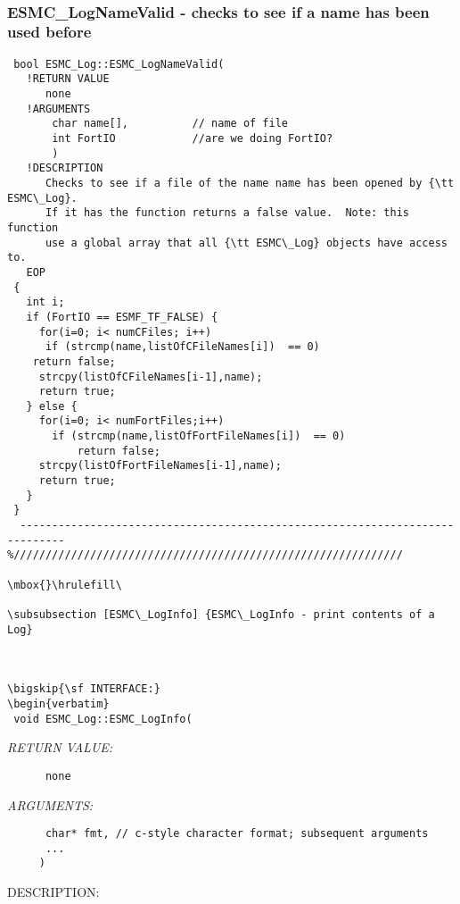  
\mbox{}\hrulefill\ 
 
\subsubsection [ESMC\_LogNameValid] {ESMC\_LogNameValid - checks to see if a name has been used before}


  
\begin{verbatim} bool ESMC_Log::ESMC_LogNameValid(
   !RETURN VALUE
      none
   !ARGUMENTS
       char name[],          // name of file
       int FortIO            //are we doing FortIO?
       )
   !DESCRIPTION
      Checks to see if a file of the name name has been opened by {\tt ESMC\_Log}.
      If it has the function returns a false value.  Note: this function
      use a global array that all {\tt ESMC\_Log} objects have access to.
   EOP
 {
   int i;
   if (FortIO == ESMF_TF_FALSE) {
     for(i=0; i< numCFiles; i++)
      if (strcmp(name,listOfCFileNames[i])  == 0) 
 	return false;
     strcpy(listOfCFileNames[i-1],name);
     return true;
   } else {
     for(i=0; i< numFortFiles;i++)
       if (strcmp(name,listOfFortFileNames[i])  == 0)
           return false;
     strcpy(listOfFortFileNames[i-1],name);
     return true;
   }
 }
  ----------------------------------------------------------------------------- 
%/////////////////////////////////////////////////////////////
 
\mbox{}\hrulefill\ 
 
\subsubsection [ESMC\_LogInfo] {ESMC\_LogInfo - print contents of a Log}


  
\bigskip{\sf INTERFACE:}
\begin{verbatim} 
 void ESMC_Log::ESMC_LogInfo(
 \end{verbatim}{\em RETURN VALUE:}
\begin{verbatim}      none\end{verbatim}{\em ARGUMENTS:}
\begin{verbatim} 
      char* fmt, // c-style character format; subsequent arguments
      ...
     )\end{verbatim}
{\sf DESCRIPTION:\\ }


